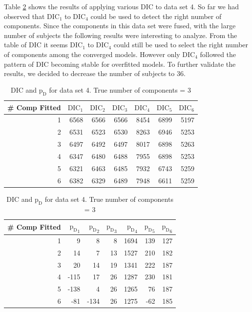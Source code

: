Table \ref{table : ds_3fused_10ppg_dic} shows the results of applying various DIC to data set 4. So far we had observed that $\text{DIC}_1$ to $\text{DIC}_4$ could be used to detect the right number of components. Since the components in this data set were fused, with the large number of subjects the following results were interesting to analyze. From the table of DIC it seems $\text{DIC}_1$ to $\text{DIC}_4$ could still be used to select the right number of components among the converged models. However only $\text{DIC}_4$ followed the pattern of DIC becoming stable for overfitted models. To further validate the results, we decided to decrease the number of subjects to 36.\\
 
\begin{table}[!htb]
\centering
\captionsetup{justification=centering}
\caption{DIC and $\text{p}_\text{D}$ for data set 4. True number of components = 3}
\label{table : ds_3fused_10ppg_dic}
\begin{tabular}{@{}rrrrrrr@{}}
\toprule
\# Comp Fitted & $\text{DIC}_1$ & $\text{DIC}_2$  & $\text{DIC}_3$  & $\text{DIC}_4$  & $\text{DIC}_5$  & $\text{DIC}_6$  \\ \midrule
1 & 6568 & 6566 & 6566 & 8454 & 6899 & 5197 \\
2 & 6531 & 6523 & 6530 & 8263 & 6946 & 5253 \\
3 & 6497 & 6492 & 6497 & 8017 & 6898 & 5263 \\
4 & 6347 & 6480 & 6488 & 7955 & 6898 & 5253 \\
5 & 6321 & 6463 & 6485 & 7932 & 6743 & 5259 \\
6 & 6382 & 6329 & 6489 & 7948 & 6611 & 5259 \\ \bottomrule
\end{tabular}

\begin{tabular}{@{}rrrrrrr@{}}
\toprule
\# Comp Fitted & ${\text{p}_\text{D}}_1$ & ${\text{p}_\text{D}}_2$ & ${\text{p}_\text{D}}_3$ & ${\text{p}_\text{D}}_4$ & ${\text{p}_\text{D}}_5$ & ${\text{p}_\text{D}}_6$ \\ \midrule
1 & 9 & 8 & 8 & 1694 & 139 & 127 \\
2 & 14 & 7 & 13 & 1527 & 210 & 182 \\
3 & 20 & 14 & 19 & 1341 & 222 & 187 \\
4 & -115 & 17 & 26 & 1287 & 230 & 181 \\
5 & -138 & 4 & 26 & 1265 & 76 & 187 \\
6 & -81 & -134 & 26 & 1275 & -62 & 185 \\ \bottomrule
\end{tabular}
\end{table}


